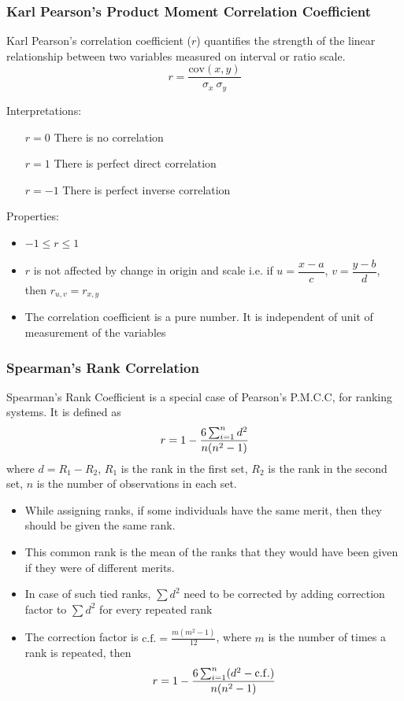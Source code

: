 \documentclass[
10pt, %
a4paper, %
]{report}
\begin{document}
\subsubsection{Karl Pearson's Product Moment Correlation Coefficient}

Karl Pearson’s correlation coefficient (\(r\)) quantifies the strength of the linear relationship between two variables measured on interval or ratio scale.
\[
r = \frac{\mathrm{cov}(x, y)}{\sigma_x \ \sigma_y}
\]

Interpretations:
\begin{itemize}
\item[\(r=0\)] There is no correlation
\item[\(r=1\)] There is perfect direct correlation
\item[\(r=-1\)] There is perfect inverse correlation
\end{itemize}

Properties:
\begin{itemize}
\item \(-1 \le r \le 1\)
\item \(r\) is not affected by change in origin and scale i.e. if \(u =\dfrac{x-a}{c}\), \(v = \dfrac{y-b}{d}\), then \(r_{u, v} = r_{x, y}\)
\item The correlation coefficient is a pure number. It is independent of unit of measurement of the variables
\end{itemize}

\subsubsection{Spearman's Rank Correlation}

Spearman's Rank Coefficient is a special case of Pearson's P.M.C.C, for ranking systems. It is defined as
\[
r = 1 - \frac{6\sum_{i=1}^{n}d^2}{n(n^2-1)}
\]
where
\(d = R_1-R_2\),
\(R_1\) is the rank in the first set,
\(R_2\) is the rank in the second set,
\(n\) is the number of observations in each set.

\begin{itemize}
\item While assigning ranks, if some individuals have the same merit, then they should be given the same rank.
\item This common rank is the mean of the ranks that they would have been given if they were of different merits.
\item In case of such tied ranks, \(\sum d^2\) need to be corrected by adding correction factor to \(\sum d^2\) for every repeated rank
\item The correction factor is \(\mathrm{c.f.} = \frac{m(m^2-1)}{12}\), where \(m\) is the number of times a rank is repeated, then
\[
r = 1 - \frac{6\sum_{i=1}^{n}(d^2-\mathrm{c.f.})}{n(n^2-1)}
\]
\end{itemize}
\end{document}
